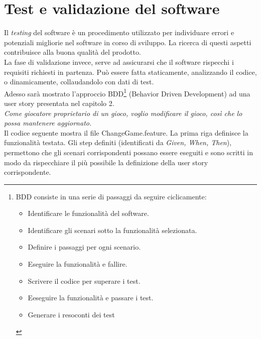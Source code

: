 \chapter{Test e validazione del software}
Il \emph{testing} del software è un procedimento utilizzato per individuare errori e potenziali migliorie nel software in corso di sviluppo. La ricerca di questi aspetti contribuisce alla buona qualità del prodotto.\cite{test}\\

La fase di validazione invece, serve ad assicurarsi che il software rispecchi i requisiti richiesti in partenza. Può essere fatta staticamente, analizzando il codice, o dinamicamente, collaudandolo con dati di test.\\

Adesso sarà mostrato l'approccio BDD\footnote{BDD consiste in una serie di passaggi da seguire ciclicamente: \begin{itemize}
    \item Identificare le funzionalità del software.
    \item Identificare gli scenari sotto la funzionalità selezionata.
    \item Definire i passaggi per ogni scenario.
    \item Eseguire la funzionalità e fallire.
    \item Scrivere il codice per superare i test.
    \item Eeseguire la funzionalità e passare i test.
    \item Generare i resoconti dei test
\end{itemize}} (Behavior Driven Development) ad una user story presentata nel capitolo 2.\\

\emph{Come giocatore proprietario di un gioco, voglio modificare il gioco, così che lo possa mantenere aggiornato.}\\

Il codice seguente mostra il file ChangeGame.feature. La prima riga definisce la funzionalità testata. Gli step definiti (identificati da \emph{Given, When, Then}), permettono che gli scenari corrispondenti possano essere eseguiti e sono scritti in modo da rispecchiare il più possibile la definizione della user story corrispondente.\\

